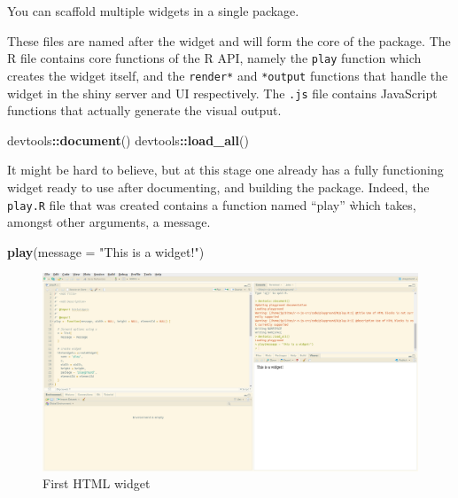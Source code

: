 \documentclass[
]{krantz}
\makeatletter
\newenvironment{Shaded}{\begin{snugshade}}{\end{snugshade}}
\newcommand{\DataTypeTok}[1]{\textcolor[rgb]{0.27,0.27,0.27}{#1}}
\newcommand{\KeywordTok}[1]{\textcolor[rgb]{0.27,0.27,0.27}{\textbf{#1}}}
\newcommand{\NormalTok}[1]{#1}
\newcommand{\OperatorTok}[1]{\textcolor[rgb]{0.43,0.43,0.43}{\textbf{#1}}}
\newcommand{\StringTok}[1]{\textcolor[rgb]{0.5,0.5,0.5}{#1}}
\newenvironment{kframe}{%
\medskip{}
\setlength{\fboxsep}{.8em}
 \def\at@end@of@kframe{}%
 \ifinner\ifhmode%
  \def\at@end@of@kframe{\end{minipage}}%
  \begin{minipage}{\columnwidth}%
 \fi\fi%
 \def\FrameCommand##1{\hskip\@totalleftmargin \hskip-\fboxsep
 \colorbox{shadecolor}{##1}\hskip-\fboxsep
     \hskip-\linewidth \hskip-\@totalleftmargin \hskip\columnwidth}%
 \MakeFramed {\advance\hsize-\width
   \@totalleftmargin\z@ \linewidth\hsize
   \@setminipage}}%
 {\par\unskip\endMakeFramed%
 \at@end@of@kframe}
\renewenvironment{Shaded}{\begin{kframe}}{\end{kframe}}
\newenvironment{rmdblock}[1]
  {
  \begin{itemize}
  \renewcommand{\labelitemi}{
    \raisebox{-.7\height}[0pt][0pt]{
      {\setkeys{Gin}{width=3em,keepaspectratio}\texttt{[image: images/\#1]}}
    }
  }
  \setlength{\fboxsep}{1em}
  \begin{kframe}
  \item
  }
  {
  \end{kframe}
  \end{itemize}
  }
\newenvironment{rmdnote}
  {\begin{rmdblock}{note}}
  {\end{rmdblock}}
\makeatother
\begin{document}
\begin{rmdnote}
You can scaffold multiple widgets in a single package.
\end{rmdnote}

These files are named after the widget and will form the core of the package. The R file contains core functions of the R API, namely the \texttt{play} function which creates the widget itself, and the \texttt{render*} and \texttt{*output} functions that handle the widget in the shiny server and UI respectively. The \texttt{.js} file contains JavaScript functions that actually generate the visual output.

\begin{Shaded}
\begin{Highlighting}[]
\NormalTok{devtools}\OperatorTok{::}\KeywordTok{document}\NormalTok{()}
\NormalTok{devtools}\OperatorTok{::}\KeywordTok{load\_all}\NormalTok{()}
\end{Highlighting}
\end{Shaded}

It might be hard to believe, but at this stage one already has a fully functioning widget ready to use after documenting, and building the package. Indeed, the \texttt{play.R} file that was created contains a function named ``play'' ẁhich takes, amongst other arguments, a message.

\begin{Shaded}
\begin{Highlighting}[]
\KeywordTok{play}\NormalTok{(}\DataTypeTok{message =} \StringTok{"This is a widget!"}\NormalTok{)}
\end{Highlighting}
\end{Shaded}

\begin{figure}
\centering
\includegraphics{images/playground-1.png}
\caption{First HTML widget}
\end{figure}
\end{document}
